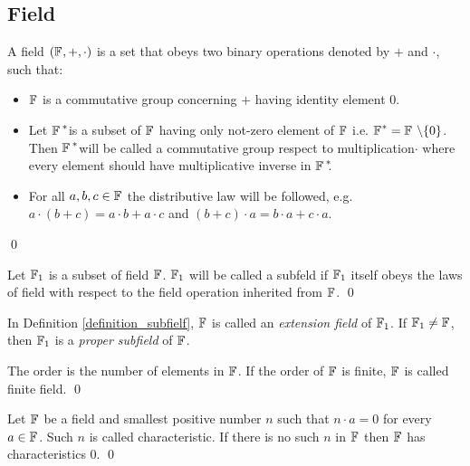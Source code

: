\subsection{Field}
\begin{definition}[Field]
	A field $({\mathbb{F}}_{},+,\cdot)$ is a set that obeys two binary operations denoted by $+$ and $\cdot$, such that:
	\begin{itemize}
		\item ${\mathbb{F}}_{}$ is a commutative group concerning $+$ having identity element $0$.
		
		\item Let ${{\mathbb{F}}_{\,}}^{\ast}\!\!$ is a subset of ${\mathbb{F}}_{}$ having only not-zero element of ${\mathbb{F}}_{}$ i.e. ${{\mathbb{F}}_{}}^{\ast}  = {{\mathbb{F}}_{} ~\backslash \{0\}}$. 
		Then ${{\mathbb{F}}_{\,}}^{\ast}\!\!$ will be called a commutative group respect to multiplication$\cdot$  where every element should have multiplicative inverse in  ${{\mathbb{F}}_{\,}}^{\ast}\!\!$.
		\item For all $a,b,c \in{\mathbb{F}}_{}$  the distributive law will be followed, e.g. $a\cdot(b+c)=a\cdot b+a\cdot c$ and $(b+c)\cdot a=b\cdot a +c\cdot a$.
	\end{itemize}
	\qed
\end{definition}
\begin{definition}\hspace{0em} \label{definition_subfielf}
	Let ${\mathbb{F}}_{1}$ is a subset of field ${\mathbb{F}}_{}$. ${\mathbb{F}}_{1}$ will be called a subfeld if ${\mathbb{F}}_{1}$ itself obeys the laws of field with respect to the field operation inherited from  ${\mathbb{F}}_{}$.
	\qed
\end{definition}
\begin{remark}
	In Definition \ref{definition_subfielf}, ${\mathbb{F}}_{}$ is called an {\em extension field} of ${\mathbb{F}}_{1}$.
	If ${\mathbb{F}}_{1}\neq {\mathbb{F}}_{}$, then ${\mathbb{F}}_{1}$ is a {\em proper subfield} of ${\mathbb{F}}_{}$.
\end{remark}

\begin{definition}\hspace{0em}
	The order is the number of elements in ${\mathbb{F}}_{}$. If the order of ${\mathbb{F}}_{}$ is finite, ${\mathbb{F}}_{}$ is called finite field. 
	\qed
\end{definition}
\begin{definition}\hspace{0em}
	Let ${\mathbb{F}}_{}$ be a field and smallest positive number $n$ such that $n \cdot a= 0$ for every $a\in {\mathbb{F}}_{}$. Such $n$ is called characteristic. If there is no such $n$ in  ${\mathbb{F}}_{}$ then ${\mathbb{F}}_{}$ has characteristics $0$.
	\qed
\end{definition}

